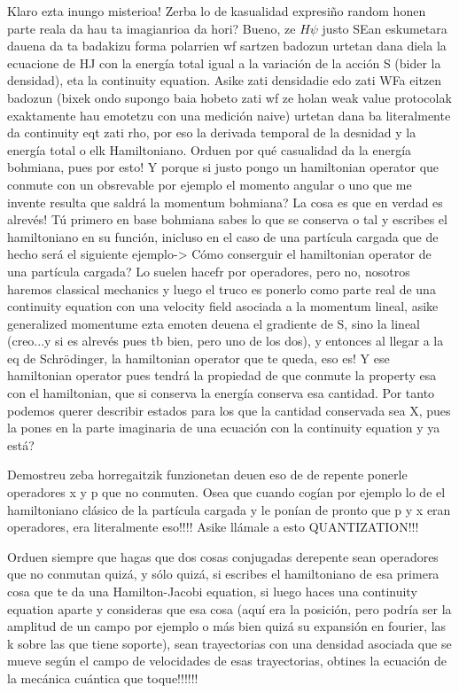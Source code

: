 \documentclass[11pt, a4paper]{article} %
\begin{document}
Klaro ezta inungo misterioa! Zerba lo de kasualidad expresiño random honen parte reala da hau ta imagianrioa da hori? Bueno, ze $H\psi$ justo SEan eskumetara dauena da ta badakizu forma polarrien wf sartzen badozun urtetan dana diela la ecuacione de HJ con la energía total igual a la variación de la acción S (bider la densidad), eta la continuity equation. Asike zati densidadie edo zati WFa eitzen badozun (bixek ondo supongo baia hobeto zati wf ze holan weak value protocolak exaktamente hau emotetzu con una medición naive) urtetan dana ba literalmente da continuity eqt zati rho, por eso la derivada temporal de la desnidad y la energía total o elk Hamiltoniano. Orduen por qué casualidad da la energía bohmiana, pues por esto! Y porque si justo pongo un hamiltonian operator que conmute con un obsrevable por ejemplo el momento angular o uno que me invente resulta que saldrá la momentum bohmiana? La cosa es que en verdad es alrevés! Tú primero en base bohmiana sabes lo que se conserva o tal y escribes el hamiltoniano en su función, inicluso en el caso de una partícula cargada que de hecho será el siguiente ejemplo-> Cómo conserguir el hamiltonian operator de una partícula cargada? Lo suelen hacefr por operadores, pero no, nosotros haremos classical mechanics y luego el truco es ponerlo como parte real de una continuity equation con una velocity field asociada a la momentum lineal, asike generalized momentume ezta emoten deuena el gradiente de S, sino la lineal (creo...y si es alrevés pues tb bien, pero uno de los dos), y entonces al llegar a la eq de Schrödinger, la hamiltonian operator que te queda, eso es! Y ese hamiltonian operator pues tendrá la propiedad de que conmute la property esa con el hamiltonian, que si conserva la energía conserva esa cantidad. Por tanto podemos querer describir estados para los que la cantidad conservada sea X, pues la pones en la parte imaginaria de una ecuación con la continuity equation y ya está?

Demostreu zeba horregaitzik funzionetan deuen eso de de repente ponerle operadores x y p que no conmuten. Osea que cuando cogían por ejemplo lo de el hamiltoniano clásico de la partícula cargada y le ponían de pronto que p y x eran operadores, era literalmente eso!!!!
Asike llámale a esto QUANTIZATION!!!

Orduen siempre que hagas que dos cosas conjugadas derepente sean operadores que no conmutan quizá, y sólo quizá, si escribes el hamiltoniano de esa primera cosa que te da una Hamilton-Jacobi equation, si luego haces una continuity equation aparte y consideras que esa cosa (aquí era la posición, pero podría ser la amplitud de un campo por ejemplo o más bien quizá su expansión en fourier, las k sobre las que tiene soporte), sean trayectorias con una densidad asociada que se mueve según el campo de velocidades de esas trayectorias, obtines la ecuación de la mecánica cuántica que toque!!!!!!
\end{document}

